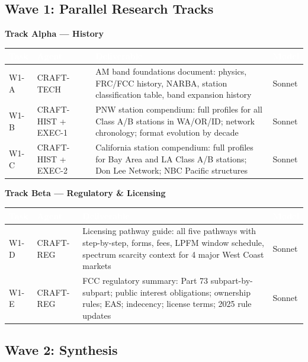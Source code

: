\documentclass[11pt,letterpaper]{article}
\newcommand{\tableheader}[1]{\textbf{\sffamily\textcolor{white}{#1}}}
\begin{document}
\begin{asciibox}
\subsection{Wave 1: Parallel Research Tracks}

\textbf{Track Alpha --- History}

\begin{center}
\begin{tabularx}{\textwidth}{L{2cm}L{2.5cm}XC{2cm}}
\toprule
{}
\tableheader{Task} & \tableheader{Agent} & \tableheader{Deliverable} & \tableheader{Model} \\
\midrule
W1-A & CRAFT-TECH & AM band foundations document: physics, FRC/FCC history, NARBA, station classification table, band expansion history & Sonnet \\
W1-B & CRAFT-HIST + EXEC-1 & PNW station compendium: full profiles for all Class A/B stations in WA/OR/ID; network chronology; format evolution by decade & Sonnet \\
W1-C & CRAFT-HIST + EXEC-2 & California station compendium: full profiles for Bay Area and LA Class A/B stations; Don Lee Network; NBC Pacific structures & Sonnet \\
\bottomrule
\end{tabularx}
\end{center}

\textbf{Track Beta --- Regulatory \& Licensing}

\begin{center}
\begin{tabularx}{\textwidth}{L{2cm}L{2.5cm}XC{2cm}}
\toprule
{}
\tableheader{Task} & \tableheader{Agent} & \tableheader{Deliverable} & \tableheader{Model} \\
\midrule
W1-D & CRAFT-REG & Licensing pathway guide: all five pathways with step-by-step, forms, fees, LPFM window schedule, spectrum scarcity context for 4 major West Coast markets & Sonnet \\
W1-E & CRAFT-REG & FCC regulatory summary: Part 73 subpart-by-subpart; public interest obligations; ownership rules; EAS; indecency; license terms; 2025 rule updates & Sonnet \\
\bottomrule
\end{tabularx}
\end{center}

\subsection{Wave 2: Synthesis}


\end{asciibox}
\end{document}
